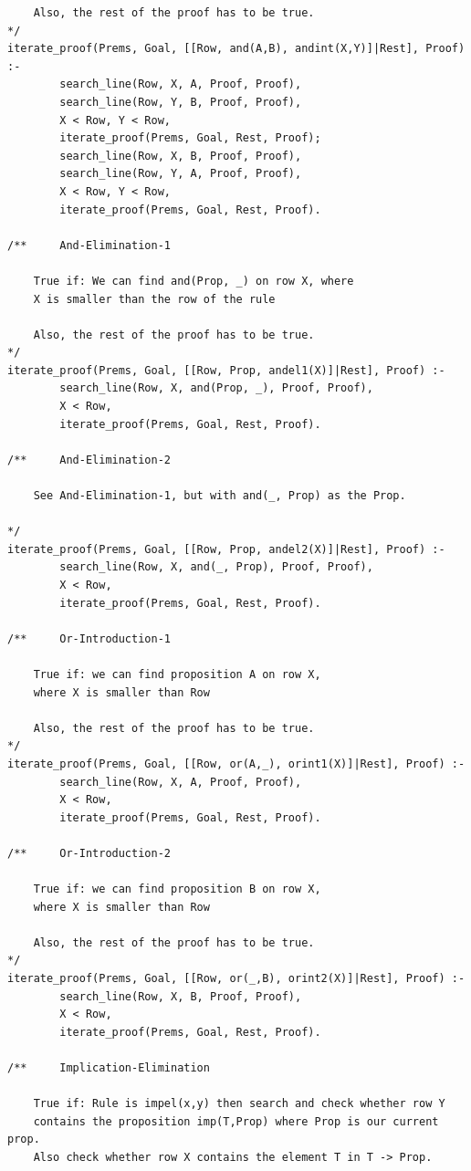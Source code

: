 \documentclass[a4paper]{article}
\begin{document}
\begin{verbatim}
	Also, the rest of the proof has to be true.
*/
iterate_proof(Prems, Goal, [[Row, and(A,B), andint(X,Y)]|Rest], Proof) :-
        search_line(Row, X, A, Proof, Proof),
        search_line(Row, Y, B, Proof, Proof),
        X < Row, Y < Row,
        iterate_proof(Prems, Goal, Rest, Proof);
        search_line(Row, X, B, Proof, Proof),
        search_line(Row, Y, A, Proof, Proof),
        X < Row, Y < Row,
        iterate_proof(Prems, Goal, Rest, Proof).

/**     And-Elimination-1

	True if: We can find and(Prop, _) on row X, where 
	X is smaller than the row of the rule
		
	Also, the rest of the proof has to be true.
*/
iterate_proof(Prems, Goal, [[Row, Prop, andel1(X)]|Rest], Proof) :-
        search_line(Row, X, and(Prop, _), Proof, Proof),
        X < Row,
        iterate_proof(Prems, Goal, Rest, Proof).

/**     And-Elimination-2

	See And-Elimination-1, but with and(_, Prop) as the Prop.

*/
iterate_proof(Prems, Goal, [[Row, Prop, andel2(X)]|Rest], Proof) :-
        search_line(Row, X, and(_, Prop), Proof, Proof),
        X < Row,
        iterate_proof(Prems, Goal, Rest, Proof).

/**     Or-Introduction-1

	True if: we can find proposition A on row X,
	where X is smaller than Row
		
	Also, the rest of the proof has to be true.
*/
iterate_proof(Prems, Goal, [[Row, or(A,_), orint1(X)]|Rest], Proof) :-
        search_line(Row, X, A, Proof, Proof),
        X < Row,
        iterate_proof(Prems, Goal, Rest, Proof).

/**     Or-Introduction-2

	True if: we can find proposition B on row X,
	where X is smaller than Row
		
	Also, the rest of the proof has to be true.
*/
iterate_proof(Prems, Goal, [[Row, or(_,B), orint2(X)]|Rest], Proof) :-
        search_line(Row, X, B, Proof, Proof),
        X < Row,
        iterate_proof(Prems, Goal, Rest, Proof).

/**     Implication-Elimination

	True if: Rule is impel(x,y) then search and check whether row Y
	contains the proposition imp(T,Prop) where Prop is our current prop.
	Also check whether row X contains the element T in T -> Prop.
        

\end{verbatim}
\end{document}

